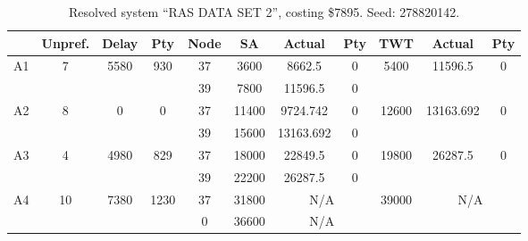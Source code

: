 \begin{sidewaystable}
\footnotesize
\caption{Resolved system ``RAS DATA SET 2'', costing \$7895. Seed: 278820142.}
\centering
\begin{tabular}{c||c|c|c||c|c|c|c||c|c|c}
  \hline \hline
  &
  Unpref. & 
  Delay &
  Pty &
  Node &
  SA &
  Actual &
  Pty &
  TWT &
  Actual &
  Pty \\
      \hline
      \multirow{2}{*}{A1} &
      \multirow{2}{*}{7} &
      \multirow{2}{*}{5580} &
      \multirow{2}{*}{930} &
      37 &
      3600 &
        8662.5 &
        0 &
      \multirow{2}{*}{5400} &
        \multirow{2}{*}{11596.5} &
        \multirow{2}{*}{0}
      \\
      \cline{5-8}
       &
       &
       &
       &
      39 &
      7800 &
        11596.5 &
        0 &
      
         &
        
      \\
      \hline
      \multirow{2}{*}{A2} &
      \multirow{2}{*}{8} &
      \multirow{2}{*}{0} &
      \multirow{2}{*}{0} &
      37 &
      11400 &
        9724.742 &
        0 &
      \multirow{2}{*}{12600} &
        \multirow{2}{*}{13163.692} &
        \multirow{2}{*}{0}
      \\
      \cline{5-8}
       &
       &
       &
       &
      39 &
      15600 &
        13163.692 &
        0 &
      
         &
        
      \\
      \hline
      \multirow{2}{*}{A3} &
      \multirow{2}{*}{4} &
      \multirow{2}{*}{4980} &
      \multirow{2}{*}{829} &
      37 &
      18000 &
        22849.5 &
        0 &
      \multirow{2}{*}{19800} &
        \multirow{2}{*}{26287.5} &
        \multirow{2}{*}{0}
      \\
      \cline{5-8}
       &
       &
       &
       &
      39 &
      22200 &
        26287.5 &
        0 &
      
         &
        
      \\
      \hline
      \multirow{2}{*}{A4} &
      \multirow{2}{*}{10} &
      \multirow{2}{*}{7380} &
      \multirow{2}{*}{1230} &
      37 &
      31800 &
        \multicolumn{2}{|c||}{N/A} &
      \multirow{2}{*}{39000} &
        \multicolumn{2}{c}{\multirow{2}{*}{N/A}}
      \\
      \cline{5-8}
       &
       &
       &
       &
      0 &
      36600 &
        \multicolumn{2}{|c||}{N/A} &
      

\end{tabular}
\end{sidewaystable}
